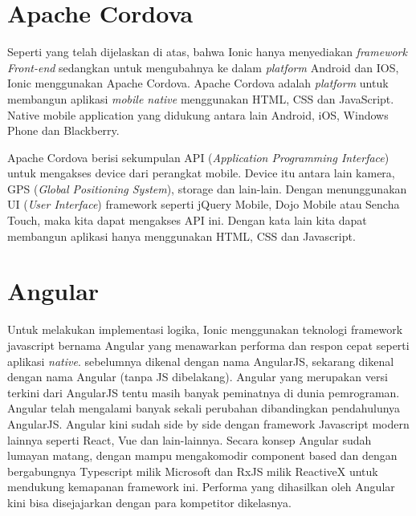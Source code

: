 \section{Apache Cordova}
\par Seperti yang telah dijelaskan di atas, bahwa Ionic hanya menyediakan \textit{framework Front-end} sedangkan untuk mengubahnya ke dalam \textit{platform} Android dan IOS, Ionic menggunakan Apache Cordova. Apache Cordova adalah \textit{platform} untuk membangun aplikasi \textit{mobile native} menggunakan HTML, CSS dan JavaScript. Native mobile application yang didukung antara lain Android, iOS, Windows Phone dan Blackberry.
\par Apache Cordova berisi sekumpulan API (\textit{Application Programming Interface}) untuk mengakses device dari perangkat mobile. Device itu antara lain kamera, GPS (\textit{Global Positioning System}), storage dan lain-lain.  Dengan menunggunakan UI (\textit{User Interface}) framework seperti jQuery Mobile, Dojo Mobile atau Sencha Touch, maka kita dapat mengakses API ini. Dengan kata lain kita dapat membangun aplikasi hanya menggunakan HTML, CSS dan Javascript.


\section{Angular}
\par Untuk melakukan implementasi logika, Ionic menggunakan teknologi framework javascript bernama Angular yang menawarkan performa dan respon cepat seperti aplikasi \textit{native}. sebelumnya dikenal dengan nama AngularJS, sekarang dikenal dengan nama Angular (tanpa JS dibelakang). Angular yang merupakan versi terkini dari AngularJS tentu masih banyak peminatnya di dunia pemrograman. Angular telah mengalami banyak sekali perubahan dibandingkan pendahulunya AngularJS. Angular kini sudah side by side dengan framework Javascript modern lainnya seperti React, Vue dan lain-lainnya. Secara konsep Angular sudah lumayan matang, dengan mampu mengakomodir component based dan dengan bergabungnya Typescript milik Microsoft dan RxJS milik ReactiveX untuk mendukung kemapanan framework ini. Performa yang dihasilkan oleh Angular kini bisa disejajarkan dengan para kompetitor dikelasnya.


